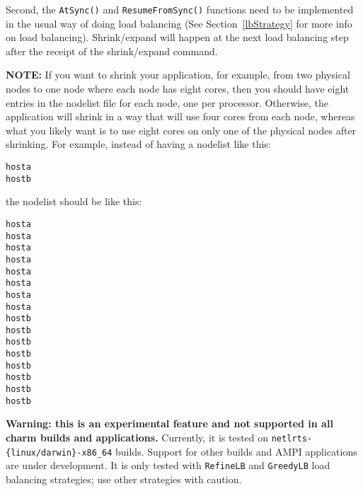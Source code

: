 Second, the \texttt{AtSync()} and \texttt{ResumeFromSync()} functions need to be
implemented in the usual way of doing load balancing (See Section~\ref{lbStrategy}
for more info on load balancing).
Shrink/expand will happen at the next load balancing step after the receipt
of the shrink/expand command.

\textbf{NOTE:} If you want to shrink your application, for example, from two physical nodes to one
node where each node has eight cores, then you should have eight entries in the nodelist file for
each node, one per processor. Otherwise, the application will shrink in a way that will use four
cores from each node, whereas what you likely want is to use eight cores on only one of the
physical nodes after shrinking.  For example, instead of having a nodelist like this:
\begin{alltt}
	host a
	host b
\end{alltt}

the nodelist should be like this:
\begin{alltt}
	host a
	host a
	host a
	host a
	host a
	host a
	host a
	host a
	host b
	host b
	host b
	host b
	host b
	host b
	host b
	host b
\end{alltt}

\textbf{Warning: this is an experimental feature and not supported in all charm
builds and applications.}
Currently, it is tested on \texttt{netlrts-\{linux/darwin\}-x86\_64} builds.
Support for other \charmpp{} builds and AMPI applications are under development.
It is only tested with \texttt{RefineLB} and \texttt{GreedyLB} load balancing
strategies; use other strategies with caution.

